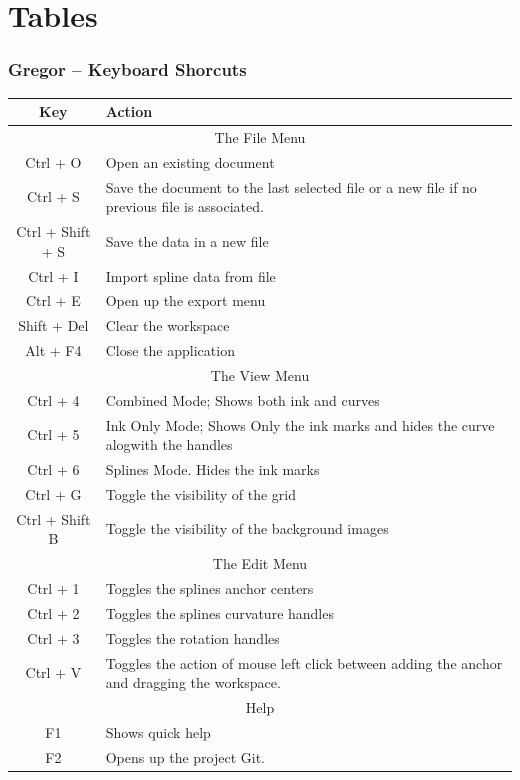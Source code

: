 \appendix
\section{Tables}
\subsubsection{Gregor -- Keyboard Shorcuts}
{
    \begin{tabular}{|c|l|}
      \hline
      Key & Action \\
      \hline
      \multicolumn{2}{|c|}{The File Menu} \\
      \hline
      Ctrl + O & Open an existing document \\
      Ctrl + S & Save the document to the last selected file or a new file if no previous file is associated. \\
      Ctrl + Shift + S & Save the data in a new file \\
      Ctrl + I & Import spline data from file \\
      Ctrl + E & Open up the export menu \\
      Shift + Del  & Clear the workspace \\
      Alt + F4 & Close the application \\
      \hline
      \multicolumn{2}{|c|}{The View Menu} \\
      \hline
      Ctrl + 4 & Combined Mode; Shows both ink and curves \\
      Ctrl + 5 & Ink Only Mode; Shows Only the ink marks and hides the curve alogwith the handles \\
      Ctrl + 6 & Splines Mode. Hides the ink marks \\
      Ctrl + G & Toggle the visibility of the grid \\
      Ctrl + Shift B & Toggle the visibility of the background images \\
      \hline
      \multicolumn{2}{|c|}{The Edit Menu} \\
      \hline
      Ctrl + 1 & Toggles the splines anchor centers \\
      Ctrl + 2 & Toggles the splines curvature handles \\
      Ctrl + 3 & Toggles the rotation handles \\
      Ctrl + V & Toggles the action of mouse left click between adding the anchor and dragging the workspace. \\
      \hline
      \multicolumn{2}{|c|}{Help}\\
      \hline
      F1 & Shows quick help \\
      F2 & Opens up the project Git.\\
      \hline
    \end{tabular}\label{Table:Keyboardshortcuts}
}
\clearpage
